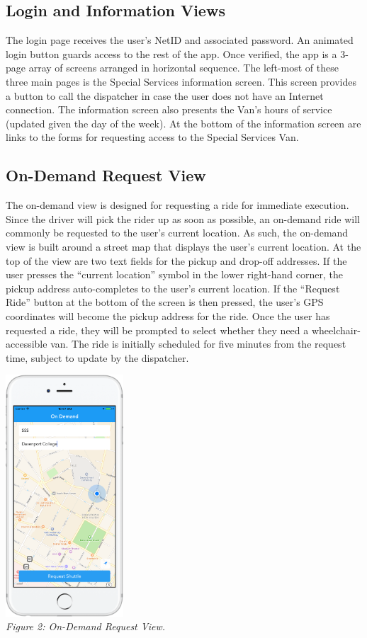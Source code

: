\documentclass[12pt, a4paper]{article}
\begin{document}
\begin{multicols*}{2}
\subsection{Login and Information Views}
The login page receives the user's NetID and associated password. An animated login button guards access to the rest of the app. Once verified, the app is a 3-page array of screens arranged in horizontal sequence. The left-most of these three main pages is the Special Services information screen. This screen provides a button to call the dispatcher in case the user does not have an Internet connection. The information screen also presents the Van's hours of service (updated given the day of the week). At the bottom of the information screen are links to the forms for requesting access to the Special Services Van.

\subsection{On-Demand Request View}
The on-demand view is designed for requesting a ride for immediate execution. Since the driver will pick the rider up as soon as possible, an on-demand ride will commonly be requested to the user's current location. As such, the on-demand view is built around a street map that displays the user's current location. At the top of the view are two text fields for the pickup and drop-off addresses. If the user presses the ``current location'' symbol in the lower right-hand corner, the pickup address auto-completes to the user's current location. If the ``Request Ride'' button at the bottom of the screen is then pressed, the user's GPS coordinates will become the pickup address for the ride. Once the user has requested a ride, they will be prompted to select whether they need a wheelchair-accessible van. The ride is initially scheduled for five minutes from the request time, subject to update by the dispatcher.
\begin{center}
	\includegraphics[keepaspectratio=true, width=0.33\textwidth]{screenshot-2.png}\\
	\textit{Figure 2: On-Demand Request View.}
\end{center}



\end{multicols*}
\end{document}

